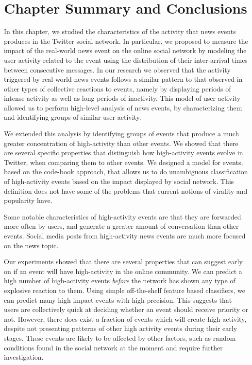 \section{Chapter Summary and Conclusions}

In this chapter, we studied the characteristics of the activity that news events
produces in the Twitter social network. 
%
In particular, we proposed to measure the impact of the real-world news event on
the online social network by modeling the user activity related to the event
using the distribution of their inter-arrival times between consecutive
messages.
%
In our research we observed that the activity triggered by real-world news
events follows a similar pattern to that observed in other types of collective
reactions to events, 
%
namely by displaying periods of intense activity as well as long periods of
inactivity.
%
This model of user activity allowed us to perform high-level analysis of news
events, by characterizing them and identifying groups of similar user activity.


We extended this analysis by identifying groups of events that produce
a much greater concentration of high-activity than other events. 
%
We showed that there are several specific properties that distinguish how
high-activity events evolve in Twitter, when comparing them to other events. 
%
We designed a model for events, based on the code-book approach, that allows us to
do unambiguous classification of high-activity events based on the impact
displayed by social network. 
%
This definition does not have some of the problems that current notions of
virality and popularity have. 
%


Some notable characteristics of high-activity events are that they are forwarded
more often by users, and generate a greater amount of conversation than other
events.
%
Social media posts from high-activity news events are much more focused on the
news topic. 
%


Our experiments showed that there are several properties that can suggest early on
if an event will have high-activity in the online community. 
%
We can predict a high number of high-activity events {\em before} the network
has shown any type of explosive reaction to them. 
%
Using simple off-the-shelf feature based classifiers, we can predict many
high-impact events with high precision. 
%
This suggests that users are collectively quick at deciding whether an event
should receive priority or not. 
%
However, there does exist a fraction of events which will create high activity,
despite not presenting patterns of other high activity events during their early
stages.
%
These events are likely to be affected by other factors, such as random
conditions found in the social network at the moment and require further
investigation.